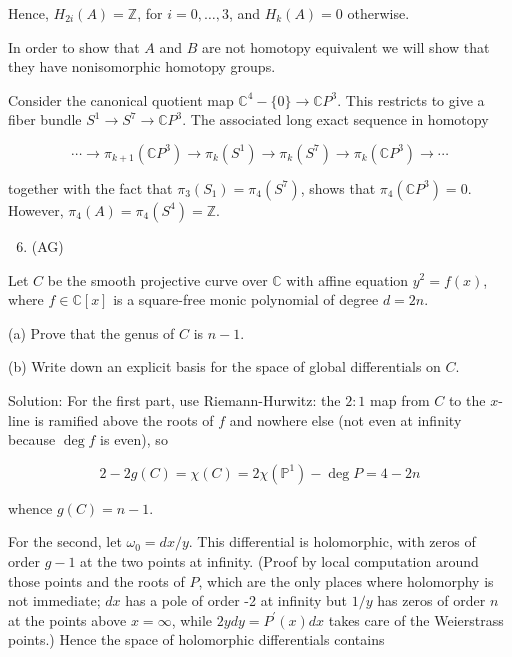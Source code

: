 \documentclass[10pt]{article}
\begin{document}
Hence, $H_{2 i}(A)=\mathbb{Z}$, for $i=0, \ldots, 3$, and $H_{k}(A)=0$ otherwise.

In order to show that $A$ and $B$ are not homotopy equivalent we will show that they have nonisomorphic homotopy groups.

Consider the canonical quotient map $\mathbb{C}^{4}-\{0\} \rightarrow \mathbb{C} P^{3}$. This restricts to give a fiber bundle $S^{1} \rightarrow S^{7} \rightarrow \mathbb{C} P^{3}$. The associated long exact sequence in homotopy

$$
\cdots \rightarrow \pi_{k+1}\left(\mathbb{C} P^{3}\right) \rightarrow \pi_{k}\left(S^{1}\right) \rightarrow \pi_{k}\left(S^{7}\right) \rightarrow \pi_{k}\left(\mathbb{C} P^{3}\right) \rightarrow \cdots
$$

together with the fact that $\pi_{3}\left(S_{1}\right)=\pi_{4}\left(S^{7}\right)$, shows that $\pi_{4}\left(\mathbb{C} P^{3}\right)=0$. However, $\pi_{4}(A)=\pi_{4}\left(S^{4}\right)=\mathbb{Z}$.

\begin{enumerate}
  \setcounter{enumi}{5}
  \item (AG)
\end{enumerate}

Let $C$ be the smooth projective curve over $\mathbb{C}$ with affine equation $y^{2}=f(x)$, where $f \in \mathbb{C}[x]$ is a square-free monic polynomial of degree $d=2 n$.

(a) Prove that the genus of $C$ is $n-1$.

(b) Write down an explicit basis for the space of global differentials on $C$.

Solution: For the first part, use Riemann-Hurwitz: the $2: 1$ map from $C$ to the $x$-line is ramified above the roots of $f$ and nowhere else (not even at infinity because $\operatorname{deg} f$ is even), so

$$
2-2 g(C)=\chi(C)=2 \chi\left(\mathbb{P}^{1}\right)-\operatorname{deg} P=4-2 n
$$

whence $g(C)=n-1$.

For the second, let $\omega_{0}=d x / y$. This differential is holomorphic, with zeros of order $g-1$ at the two points at infinity. (Proof by local computation around those points and the roots of $P$, which are the only places where holomorphy is not immediate; $d x$ has a pole of order -2 at infinity but $1 / y$ has zeros of order $n$ at the points above $x=\infty$, while $2 y d y=P^{\prime}(x) d x$ takes care of the Weierstrass points.) Hence the space of holomorphic differentials contains
\end{document}
